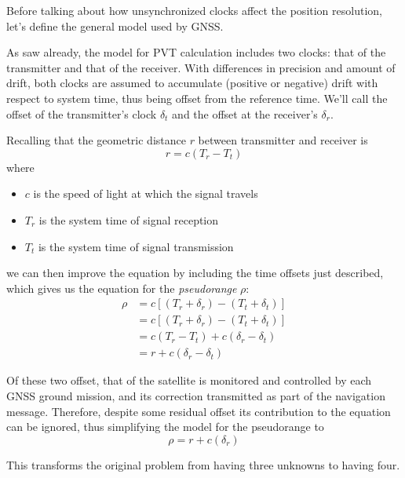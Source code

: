 Before talking about how unsynchronized clocks affect the position resolution,
let's define the general model used by GNSS.

As saw already, the model for PVT calculation includes two clocks: that of the
transmitter and that of the receiver. With differences in precision and amount
of drift, both clocks are assumed to accumulate (positive or negative) drift
with respect to system time, thus being offset from the reference time.
We'll call the offset of the transmitter's clock $\delta_t$ and the offset at
the receiver's $\delta_r$.

Recalling that the geometric distance $r$ between transmitter and receiver is
\begin{equation}
  r = c(T_r - T_t)
\end{equation}
where
\begin{itemize}
  \item $c$ is the speed of light at which the signal travels
  \item $T_r$ is the system time of signal reception
  \item $T_t$ is the system time of signal transmission
\end{itemize}
we can then improve the equation by including the time offsets just described,
which gives us the equation for the \textit{pseudorange} $\rho$:
\begin{equation}
  \begin{aligned}
    \rho &= c[(T_r + \delta_r) - (T_t + \delta_t)] \\
    & = c[(T_r + \delta_r) - (T_t + \delta_t)] \\
    & = c(T_r - T_t) + c(\delta_r - \delta_t) \\
    & = r + c(\delta_r - \delta_t)
  \end{aligned}
\end{equation}

Of these two offset, that of the satellite is monitored and controlled by each
GNSS ground mission, and its correction transmitted as part of the navigation
message. Therefore, despite some residual offset its contribution to the
equation can be ignored, thus simplifying the model for the pseudorange to
\begin{equation} \label{eq:pseudorange}
  \rho = r + c(\delta_r)
\end{equation}

This transforms the original problem from having three unknowns to having four.

